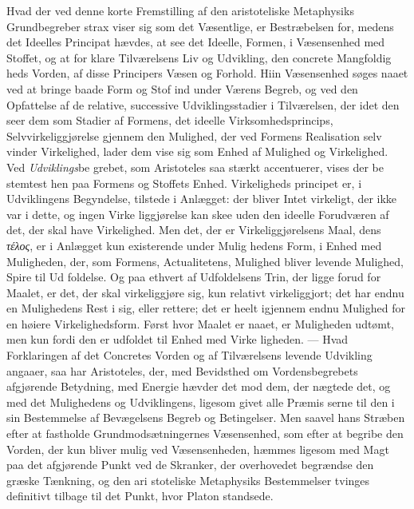 \documentclass[12pt,a4paper]{book}
\newcommand{\gk}[1]{\textit{#1}}
\begin{document}
Hvad der ved denne korte Fremstilling af den aristoteliske
Metaphysiks Grundbegreber strax viser sig som det Væsentlige,
er Bestræbelsen for, medens det Ideelles Principat hævdes, at
see det Ideelle, Formen, i Væsensenhed med Stoffet, og at for\-%
klare Tilværelsens Liv og Udvikling, den concrete Mangfoldig\-%
heds Vorden, af disse Principers Væsen og Forhold. Hiin
Væsensenhed søges naaet ved at bringe baade Form og Stof
ind under Værens Begreb, og ved den Opfattelse af de relative,
successive Udviklingsstadier i Tilværelsen, der idet den seer
dem som Stadier af Formens, det ideelle Virksomhedsprincips,
Selvvirkeliggjørelse gjennem den Mulighed, der ved Formens
Realisation selv vinder Virkelighed, lader dem vise sig som
Enhed af Mulighed og Virkelighed. Ved \emph{Udviklings}be\-%
grebet, som Aristoteles saa stærkt accentuerer, vises der be\-%
stemtest hen paa Formens og Stoffets Enhed. Virkeligheds\-%
principet er, i Udviklingens Begyndelse, tilstede i Anlægget:
der bliver Intet virkeligt, der ikke var i dette, og ingen Virke\-%
liggjørelse kan skee uden den ideelle Forudværen af det, der
skal have Virkelighed. Men det, der er Virkeliggjørelsens
Maal, dens \gk{τέλος}, er i Anlægget kun existerende under Mulig\-%
hedens Form, i Enhed med Muligheden, der, som Formens,
Actualitetens, Mulighed bliver levende Mulighed, Spire til Ud\-%
foldelse. Og paa ethvert af Udfoldelsens Trin, der ligge forud
for Maalet, er det, der skal virkeliggjøre sig, kun relativt
virkeliggjort; det har endnu en Mulighedens Rest i sig, eller
rettere; det er heelt igjennem endnu Mulighed for en høiere
Virkelighedsform. Først hvor Maalet er naaet, er Muligheden
udtømt, men kun fordi den er udfoldet til Enhed med Virke\-%
ligheden. --- Hvad Forklaringen af det Concretes Vorden og af
Tilværelsens levende Udvikling angaaer, saa har Aristoteles,
der, med Bevidsthed om Vordensbegrebets afgjørende Betydning,
med Energie hævder det mod dem, der nægtede det, og med
det Mulighedens og Udviklingens, ligesom givet alle Præmis\-%
serne til den i sin Bestemmelse af Bevægelsens Begreb og
Betingelser. Men saavel hans Stræben efter at fastholde
Grundmodsætningernes Væsensenhed, som efter at begribe den
Vorden, der kun bliver mulig ved Væsensenheden, hæmmes
ligesom med Magt paa det afgjørende Punkt ved de Skranker,
der overhovedet begrændse den græske Tænkning, og den ari\-%
stoteliske Metaphysiks Bestemmelser tvinges definitivt tilbage
til det Punkt, hvor Platon standsede.
\end{document}
